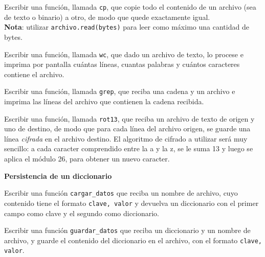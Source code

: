 \begin{ejercicio}
Escribir una función, llamada \lstinline|cp|, que copie todo el contenido de un
archivo (sea de texto o binario) a otro, de modo que quede exactamente igual.\\
{\bf Nota}: utilizar \lstinline!archivo.read(bytes)! para leer como máximo
una cantidad de bytes.
\end{ejercicio}

\begin{ejercicio}
Escribir una función, llamada \lstinline|wc|, que dado un archivo de texto, lo procese e
imprima por pantalla cuántas líneas, cuantas palabras y cuántos caracteres
contiene el archivo.
\end{ejercicio}

\begin{ejercicio}
Escribir una función, llamada \lstinline|grep|, que reciba una cadena y un
archivo e imprima las líneas del archivo que contienen la cadena recibida.
\end{ejercicio}

\begin{ejercicio}
Escribir una función, llamada \lstinline|rot13|, que reciba un archivo de texto de
origen y uno de destino, de modo que para cada línea del archivo origen, se
guarde una línea \emph{cifrada} en el archivo destino.  El algoritmo de cifrado
a utilizar será muy sencillo: a cada caracter comprendido entre la a y la z, se
le suma 13 y luego se aplica el módulo 26, para obtener un nuevo caracter.
\end{ejercicio}

\begin{ejercicio} {\bf Persistencia de un diccionario}
\begin{partes}
  \item Escribir una función \lstinline!cargar_datos! que reciba un nombre de
archivo, cuyo contenido tiene el formato \lstinline!clave, valor! y devuelva un
diccionario con el primer campo como clave y el segundo como diccionario.
  \item Escribir una función \lstinline!guardar_datos! que reciba un diccionario
y un nombre de archivo, y guarde el contenido del diccionario en el archivo,
con el formato \lstinline!clave, valor!.
\end{partes}
\end{ejercicio}

